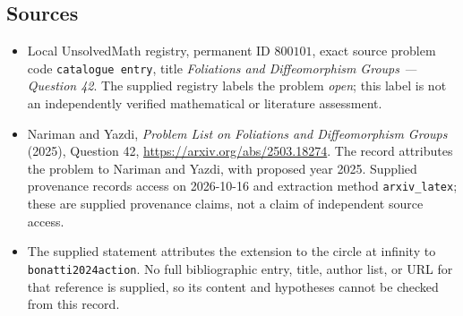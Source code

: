 \documentclass[11pt]{article}
\begin{document}
\subsection{Sources}
\begin{itemize}
\item Local UnsolvedMath registry, permanent ID \(800101\), exact source problem code \texttt{catalogue entry}, title \emph{Foliations and Diffeomorphism Groups --- Question 42}. The supplied registry labels the problem \emph{open}; this label is not an independently verified mathematical or literature assessment.
\item Nariman and Yazdi, \emph{Problem List on Foliations and Diffeomorphism Groups} (2025), Question 42, \url{https://arxiv.org/abs/2503.18274}. The record attributes the problem to Nariman and Yazdi, with proposed year 2025. Supplied provenance records access on 2026-10-16 and extraction method \texttt{arxiv\_latex}; these are supplied provenance claims, not a claim of independent source access.
\item The supplied statement attributes the extension to the circle at infinity to \texttt{bonatti2024action}. No full bibliographic entry, title, author list, or URL for that reference is supplied, so its content and hypotheses cannot be checked from this record.
\end{itemize}
\end{document}
